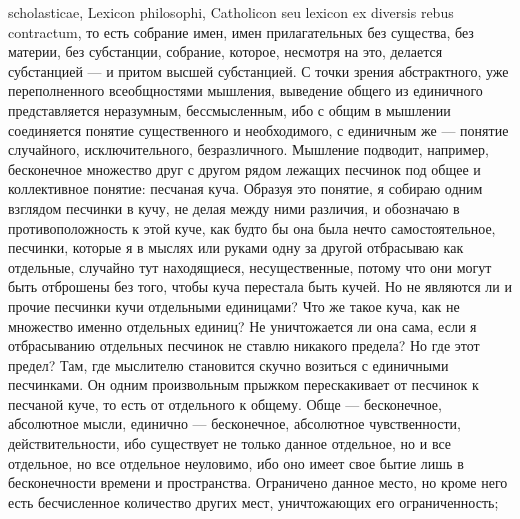 \documentclass[12pt]{article}
\begin{document}
scholasticae, Lexicon philosophi, Catholicon seu lexicon ex diversis rebus contractum, то есть собрание имен, имен прилагательных без существа, без материи, без субстанции, собрание, которое, несмотря на это, делается субстанцией --- и притом высшей субстанцией. С точки зрения абстрактного, уже переполненного всеобщностями мышления, выведение общего из единичного представляется неразумным, бессмысленным, ибо с общим в мышлении соединяется понятие существенного и необходимого, с единичным же --- понятие случайного, исключительного, безразличного. Мышление подводит, например, бесконечное множество друг с другом рядом лежащих песчинок под общее и коллективное понятие: песчаная куча. Образуя это понятие, я собираю одним взглядом песчинки в кучу, не делая между ними различия, и обозначаю в противоположность к этой куче, как будто бы она была нечто самостоятельное, песчинки, которые я в мыслях или руками одну за другой отбрасываю как отдельные, случайно тут находящиеся, несущественные, потому что они могут быть отброшены без того, чтобы куча перестала быть кучей. Но не являются ли и прочие песчинки кучи отдельными единицами? Что же такое куча, как не множество именно отдельных единиц? Не уничтожается ли она сама, если я отбрасыванию отдельных песчинок не ставлю никакого предела? Но где этот предел? Там, где мыслителю становится скучно возиться с единичными песчинками. Он одним произвольным прыжком перескакивает от песчинок к песчаной куче, то есть от отдельного к общему. Обще --- бесконечное, абсолютное мысли, единично --- бесконечное, абсолютное чувственности, действительности, ибо существует не только данное отдельное, но и все отдельное, но все отдельное неуловимо, ибо оно имеет свое бытие лишь в бесконечности времени и пространства. Ограничено данное место, но кроме него есть бесчисленное количество других мест, уничтожающих его ограниченность; 
\end{document}
